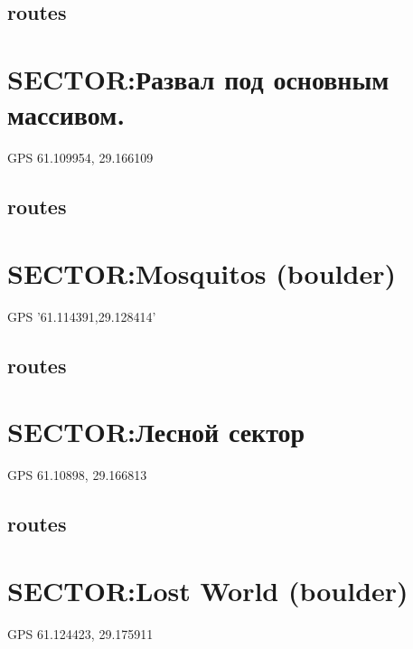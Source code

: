 \documentclass[8pt, a5paper,notitlepage,openany]{report}
\begin{document}
\section*{routes}


\chapter{SECTOR:Развал под основным массивом.}
 GPS 61.109954, 29.166109
%
\newpage
\section*{routes}



\clearpage 
\chapter{SECTOR:Mosquitos (boulder)}
 GPS '61.114391,29.128414'
%
\section*{routes}


\clearpage 
\chapter{SECTOR:Лесной сектор}
 GPS 61.10898, 29.166813
%
\newpage
\section*{routes}


\clearpage 
\chapter{SECTOR:Lost World (boulder)}
 GPS 61.124423, 29.175911
%
\newpage
\end{document}
